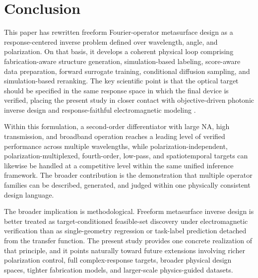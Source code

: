 \section{Conclusion}

This paper has rewritten freeform Fourier-operator metasurface design as a response-centered inverse problem defined over wavelength, angle, and polarization. On that basis, it develops a coherent physical loop comprising fabrication-aware structure generation, simulation-based labeling, score-aware data preparation, forward surrogate training, conditional diffusion sampling, and simulation-based reranking. The key scientific point is that the optical target should be specified in the same response space in which the final device is verified, placing the present study in closer contact with objective-driven photonic inverse design and response-faithful electromagnetic modeling \cite{an2019deep,ma2019probabilistic,phillips2021ensemble}.

Within this formulation, a second-order differentiator with large NA, high transmission, and broadband operation reaches a leading level of verified performance across multiple wavelengths, while polarization-independent, polarization-multiplexed, fourth-order, low-pass, and spatiotemporal targets can likewise be handled at a competitive level within the same unified inference framework. The broader contribution is the demonstration that multiple operator families can be described, generated, and judged within one physically consistent design language.

The broader implication is methodological. Freeform metasurface inverse design is better treated as target-conditioned feasible-set discovery under electromagnetic verification than as single-geometry regression or task-label prediction detached from the transfer function. The present study provides one concrete realization of that principle, and it points naturally toward future extensions involving richer polarization control, full complex-response targets, broader physical design spaces, tighter fabrication models, and larger-scale physics-guided datasets.

